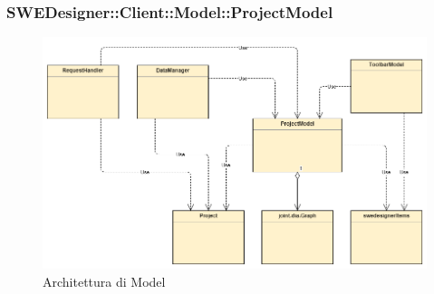 \documentclass[../DefinizioneDiProdotto.tex]{subfiles}
\begin{document}
				\subsubsection{SWEDesigner::Client::Model::ProjectModel}
				\hypertarget{SWEDesigner::Client::Model::ProjectModel}{}
					\begin{figure}[H]\label{fig:Model}
						\centering
						\includegraphics[scale=0.46]{Immagini/DiagrammaArchitettura/MainModel.png}
						\caption{Architettura di Model}
					\end{figure}
\end{document}
